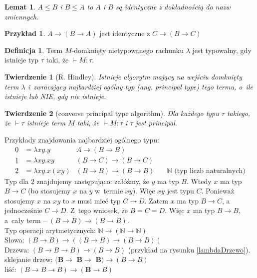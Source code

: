 \documentclass[10pt,a4paper]{article}
\theoremstyle{plain}
\newtheorem{theorem}{Twierdzenie}
\newtheorem{lemma}{Lemat}
\theoremstyle{definition}
\newtheorem*{definition}{Definicja}
\newtheorem*{example}{Przykład}
\newcommand{\impl}{\rightarrow}
\begin{document}
\begin{lemma}
$A \leq B$ i $B \leq A$ to $A$ i $B$ są identyczne z dokładnością do nazw
zmiennych.
\end{lemma}


\begin{example}
$A \impl (B \impl A)$ jest identyczne z $C \impl (B \impl C)$
\end{example}

\begin{definition}
Term $M$-domknięty nietypowanego rachunku $\lambda$ jest typowalny, gdy istnieje
typ $\tau$ taki, że $\vdash M:\tau$.
\end{definition}


\begin{theorem}[R. Hindley]
Istnieje algorytm mający na wejściu domknięty term $\lambda$ i~zwracający
najbardziej ogólny typ (ang. \emph{principal type}) tego termu, o~ile istnieje
lub NIE, gdy nie istnieje.
\end{theorem}

\begin{theorem}[converse principal type algorithm]
Dla każdego typu $\tau$ takiego, że $\vdash \tau$ istnieje term $M$ taki,
że $\vdash M:\tau$ i $\tau$ jest principal.
\end{theorem}

Przykłady znajdowania najbardziej ogólnego typu:
\begin{align*}
\underline{0} & = \lambda xy. y  & A \impl (B \impl B) &\\
\underline{1} & = \lambda xy. xy  & (B \impl C) \impl (B \impl C) &\\
\underline{2} & = \lambda xy. x(xy) &  (B \impl B) \impl (B \impl B) & \quad
  \mathbb{N} \text{ (typ liczb naturalnych)}
\end{align*}
Typ dla $\underline{2}$ znajdujemy następująco: załóżmy, że $y$ ma typ $B$.
Wtedy $x$ ma typ $B\impl C$ (bo stosujemy $x$ na $y$ w~termie $xy$). Więc
$xy$ jest typu $C$. Ponieważ stosujemy $x$ na $xy$ to $x$ musi mieć typ
$C\impl D$. Zatem $x$ ma typ $B\impl C$, a jednocześnie $C\impl D$.
Z~tego wniosek, że $B=C=D$. Więc $x$ ma typ $B\impl B$, a~cały term --
$(B \impl B) \impl (B \impl B)$. \\
Typ operacji arytmetycznych: $\mathbb{N} \impl(\mathbb{N} \impl\mathbb{N})$\\
Słowa: $(B\impl B) \impl ((B\impl B) \impl (B\impl B))$\\
Drzewa: $(B\impl B\impl B) \impl (B \impl B)$ (przykład na rysunku
\ref{lambdaDrzewo}).\\
sklejanie drzew: $\textbf{(B$\impl$ B$\impl$ B)} \impl (B \impl B)$\\
liść: $(B\impl B\impl B) \impl (\textbf{B} \impl B)$\\
\end{document}
